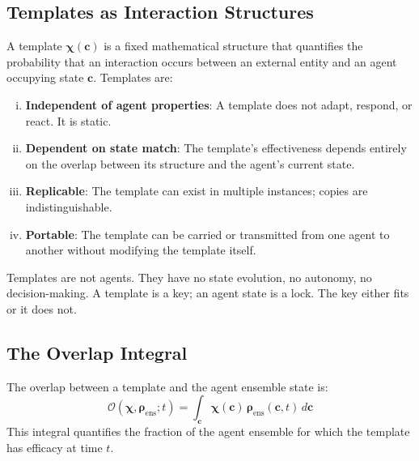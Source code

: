 \documentclass[11pt,twocolumn,a4paper]{article}
\newcommand{\Template}{\boldsymbol{\chi}}
\newcommand{\State}{\boldsymbol{\rho}}
\newcommand{\Overlap}{\mathcal{O}}
\begin{document}
\subsection{Templates as Interaction Structures}

\begin{definition}[Template]
A template $\Template(\mathbf{c})$ is a fixed mathematical structure that quantifies the probability that an interaction occurs between an external entity and an agent occupying state $\mathbf{c}$. Templates are:
\begin{enumerate}[(i)]
\item \textbf{Independent of agent properties}: A template does not adapt, respond, or react. It is static.
\item \textbf{Dependent on state match}: The template's effectiveness depends entirely on the overlap between its structure and the agent's current state.
\item \textbf{Replicable}: The template can exist in multiple instances; copies are indistinguishable.
\item \textbf{Portable}: The template can be carried or transmitted from one agent to another without modifying the template itself.
\end{enumerate}
\end{definition}

\begin{remark}
Templates are not agents. They have no state evolution, no autonomy, no decision-making. A template is a key; an agent state is a lock. The key either fits or it does not.
\end{remark}

\subsection{The Overlap Integral}

\begin{definition}
The overlap between a template and the agent ensemble state is:
\begin{equation}
\Overlap(\Template, \State_{\mathrm{ens}}; t) = \int_{\mathbf{c}} \Template(\mathbf{c}) \, \State_{\mathrm{ens}}(\mathbf{c}, t) \, d\mathbf{c}
\label{eq:overlap_integral}
\end{equation}
This integral quantifies the fraction of the agent ensemble for which the template has efficacy at time $t$.
\end{definition}
\end{document}
